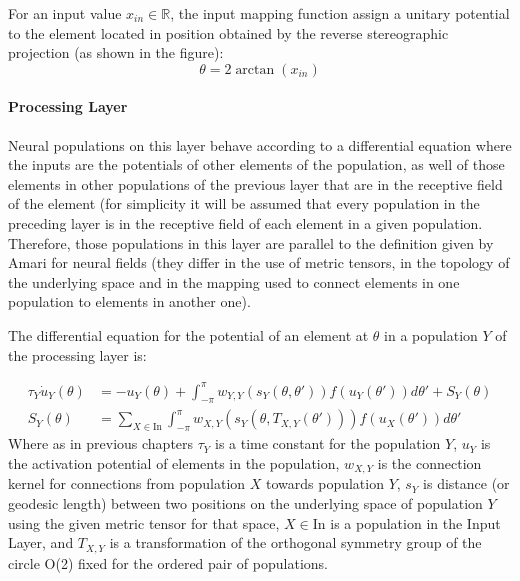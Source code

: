 
For an input value $x_{in} \in \mathbb{R}$, the input mapping function
assign a unitary potential to the element located in position obtained
by the reverse stereographic projection (as shown in the figure):
\begin{equation}
  \label{eq:eqn-inpos}
  \theta=2\arctan \left(x_{in} \right)
\end{equation}

\paragraph{Processing Layer}
Neural populations on this layer behave according to a differential
equation where the inputs are the potentials of other elements of the
population, as well of those elements in other populations of the
previous layer that are in the receptive field of the element (for
simplicity it will be assumed that every population in the preceding
layer is in the receptive field of each element in a given
population. Therefore, those populations in this layer are parallel to
the definition given by Amari for neural fields (they differ in the
use of metric tensors, in the topology of the underlying space and in
the mapping used to connect elements in one population to elements in
another one).

The differential equation for the potential of an element at $\theta$
in a population $Y$ of the processing layer is:

\begin{align}
  \label{eq:lnf-oned}
  \tau_Y\dot{u}_Y(\theta)&=-u_Y(\theta)+\int_{-\pi}^{\pi}{w_{Y,Y}\left(s_Y(\theta,\theta')
    \right) f\left(u_Y(\theta') \right) d\theta'} + S_Y(\theta) \\
  S_Y(\theta)&=\sum_{X \in
    \mathrm{In}}\int_{-\pi}^{\pi}{w_{X,Y}\left(s_Y(\theta,T_{X,Y}(\theta'))
    \right) f\left(u_X(\theta') \right) d\theta'}
\end{align}
Where as in previous chapters $\tau_Y$ is a time constant for the
population $Y$, $u_Y$ is the activation potential of elements in the
population, $w_{X,Y}$ is the connection kernel for connections from
population $X$ towards population $Y$, $s_Y$ is distance (or geodesic
length) between two positions on the underlying space of population
$Y$ using the given metric tensor for that space, $X \in $In is a
population in the Input Layer, and $T_{X,Y}$ is a transformation of
the orthogonal symmetry group of the circle O(2) fixed for the ordered
pair of populations.

